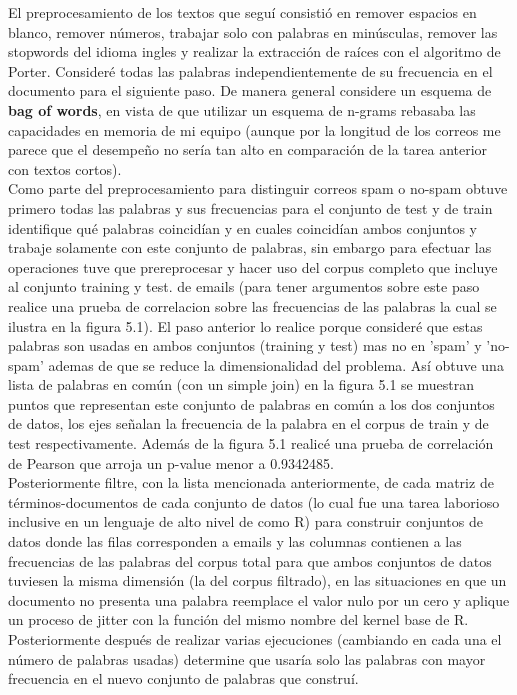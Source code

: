 \documentclass[paper=letter, fontsize=11pt]{scrartcl}
\numberwithin{equation}{section} %
\numberwithin{figure}{section} %
\numberwithin{table}{section} %
\begin{document}
El preprocesamiento de los textos que seguí consistió en remover espacios en blanco, remover números, trabajar solo con palabras en minúsculas, remover las stopwords del idioma ingles y realizar la extracción de raíces con el algoritmo de Porter. Consideré todas las palabras independientemente de su frecuencia en el documento para el siguiente paso. De manera general considere un esquema de \textbf{bag of words}, en vista de que utilizar un esquema de n-grams rebasaba las capacidades en memoria de mi equipo (aunque por la longitud de los correos me parece que el desempeño no sería tan alto en comparación de la tarea anterior con textos cortos).\\
Como parte del preprocesamiento para distinguir correos spam o no-spam obtuve primero todas las palabras y sus frecuencias para el conjunto de test y de train identifique qué palabras coincidían y en cuales coincidían ambos conjuntos y trabaje solamente con este conjunto de palabras, sin embargo para efectuar las operaciones tuve que prereprocesar y hacer uso del corpus completo que incluye al conjunto training y test. de emails (para tener argumentos sobre este paso realice una prueba de correlacion sobre las frecuencias de las palabras la cual se ilustra en la figura 5.1). El paso anterior lo realice porque consideré que estas palabras son usadas en ambos conjuntos (training y test) mas no en 'spam' y 'no-spam' ademas de que se reduce la dimensionalidad del problema. Así obtuve una lista de palabras en común (con un simple join) en la figura 5.1 se muestran puntos que representan este conjunto de palabras en común a los dos conjuntos de datos, los ejes señalan la frecuencia de la palabra en el corpus de train y de test respectivamente. Además de la figura 5.1 realicé una prueba de correlación de Pearson que arroja un p-value menor a  0.9342485. \\
Posteriormente filtre, con la lista mencionada anteriormente, de cada matriz de términos-documentos de cada conjunto de datos (lo cual fue una tarea laborioso inclusive en un lenguaje de alto nivel de como R) para construir conjuntos de datos donde las filas corresponden a emails y las columnas contienen a las frecuencias de las palabras del corpus total para que ambos conjuntos de datos tuviesen la misma dimensión (la del corpus filtrado), en las situaciones en que un documento no presenta una palabra reemplace el valor nulo por un cero y aplique un proceso de jitter con la función del mismo nombre del kernel base de R. Posteriormente después de realizar varias ejecuciones (cambiando en cada una el número de palabras usadas) determine que usaría solo las palabras con mayor frecuencia en el nuevo conjunto de palabras que construí. \\
\end{document}
